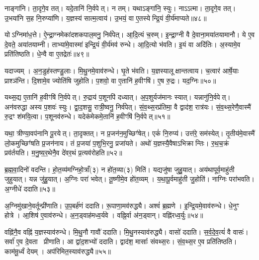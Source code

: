 नाङ्गा॑नि।
ता॒दृगे॒व तत्।
यदे॒तानि॑ नि॒र्वपेत्।
न तम्।
यथाऽङ्गा॑नि॒ स्युः।
नाऽऽत्मा।
ता॒दृगे॒व तत्।
उ॒भया॑नि स॒ह नि॒रुप्या॑णि।
य॒ज्ञस्य॑ सात्म॒त्वाय॑।
उ॒भयं॒ वा ए॒तस्येन्द्रि॒यं वी॒र्य॑माप्यते॥४८॥

योऽग्निमा॑ध॒त्ते।
ऐ॒न्द्रा॒ग्नमेका॑दशकपाल॒मनु॒ निर्व॑पेत्।
आ॒दि॒त्यं च॒रुम्।
इ॒न्द्रा॒ग्नी वै दे॒वाना॒मया॑तयामानौ।
ये ए॒व दे॒वते॒ अया॑तयाम्नी।
ताभ्या॑मे॒वास्मा॑ इन्द्रि॒यं वी॒र्य॑मव॑ रुन्धे।
आ॒दि॒त्यो भ॑वति।
इ॒यं वा अदि॑तिः।
अ॒स्यामे॒व प्रति॑तिष्ठति।
धे॒न्वै वा ए॒तद्रेतः॑॥४९॥

यदाज्यम्।
अ॒न॒डुह॑स्तण्डु॒लाः।
मि॒थु॒नमे॒वाव॑रुन्धे।
घृ॒ते भ॑वति।
य॒ज्ञस्यालूक्षान्तत्वाय।
च॒त्वार॑ आर्\mbox{}षे॒याः प्राश्ञ॑न्ति।
दि॒शामे॒व ज्योति॑षि जुहोति।
प॒शवो॒ वा ए॒तानि॑ ह॒वीꣳषि॑।
ए॒ष रु॒द्रः।
यद॒ग्निः॥५०॥

यथ्स॒द्य ए॒तानि॑ ह॒वीꣳषि॑ नि॒र्वपेत्।
रु॒द्राय॑ प॒शूनपि॑ दध्यात्।
अ॒प॒शुर्यज॑मानः स्यात्।
यन्नानु॑नि॒र्वपेत्।
अन॑वरुद्धा अस्य प॒शवः॑ स्युः।
द्वा॒द॒शसु॒ रात्री॒ष्वनु॒ निर्व॑पेत्।
सं॒व॒थ्स॒रप्र॑तिमा॒ वै द्वाद॑श॒ रात्र॑यः।
सं॒व॒थ्स॒रेणै॒वास्मै॑ रु॒द्रꣳ श॑मयि॒त्वा।
प॒शूनव॑रुन्धे।
यदेक॑मेकमे॒तानि॑ ह॒वीꣳषि॑ नि॒र्वपेत्॥५१॥

यथा॒ त्रीण्या॒वप॑नानि पू॒रयेत्।
ता॒दृक्तत्।
न प्र॒जन॑न॒\-मुच्छिꣳ॑षेत्।
एकं॑ नि॒रुप्य॑।
उत्त॑रे॒ सम॑स्येत्।
तृ॒तीय॑मे॒वास्मै॑ लो॒कमुच्छिꣳ॑षति प्र॒जन॑नाय।
तं प्र॒जया॑ प॒शुभि॒रनु॒ प्रजा॑यते।
अथो॑ य॒ज्ञस्यै॒वैषा\-ऽभिक्रान्तिः।
र॒थ॒च॒क्रं प्रव॑र्तयति।
म॒नु॒ष्य॒र॒थेनै॒व दे॑वर॒थं प्र॒त्यव॑रोहति॥५२॥

ब्र॒ह्म॒वा॒दिनो॑ वदन्ति।
हो॒त॒व्य॑मग्निहो॒त्राँ(३) न हो॑त॒व्या(३) मिति॑।
यद्यजु॑षा जुहु॒यात्।
अय॑थापूर्व॒माहु॑ती जुहुयात्।
यन्न जु॑हु॒यात्।
अ॒ग्निः परा॑ भवेत्।
तू॒ष्णीमे॒व हो॑त॒व्यम्।
य॒था॒पू॒र्वमाहु॑ती जु॒होति॑।
नाग्निः परा॑भवति।
अ॒ग्नीधे॑ ददाति॥५३॥

अ॒ग्निमु॑खाने॒वर्तून्प्री॑णाति।
उ॒प॒बर्\mbox{}ह॑णं ददाति।
रू॒पाणा॒मव॑\-रुद्ध्यै।
अश्वं॑ ब्र॒ह्मणे।
इ॒न्द्रि॒यमे॒वाव॑रुन्धे।
धे॒नुꣳ होत्रे।
आ॒शिष॑ ए॒वाव॑रुन्धे।
अ॒न॒ड्वाह॑मध्व॒र्यवे।
वह्नि॒र्वा अ॑न॒ड्वान्।
वह्नि॑रध्व॒र्युः॥५४॥

वह्नि॑नै॒व वह्नि॑ य॒ज्ञस्याव॑रुन्धे।
मि॒थु॒नौ गावौ॑ ददाति।
मि॒थु॒नस्याव॑रुद्ध्यै।
वासो॑ ददाति।
स॒र्व॒दे॒व॒त्यं॑ वै वासः॑।
सर्वा॑ ए॒व दे॒वता प्रीणाति।
आ द्वा॑द॒शभ्यो॑ ददाति।
द्वाद॑श॒ मासाः᳚ संवथ्स॒रः।
सं॒व॒थ्स॒र ए॒व प्रति॑तिष्ठति।
काम॑मू॒र्ध्वं देयम्।
अप॑रिमित॒स्याव॑रुद्ध्यै॥५५॥\anuvakamend[आ॒दि॒त्ये तृती॑यम॒फ्स्वासी॒त्तत्तेनावा॑रुन्धत॒ स्यादाप्यते॒ रेतो॒\-ऽग्निरेक॑मेकमे॒तानि॑ ह॒वीꣳषि॑ नि॒र्वपेत्प्र॒त्यव॑रोहति ददात्यध्व॒र्युर्देय॒मेकं॑ च]

